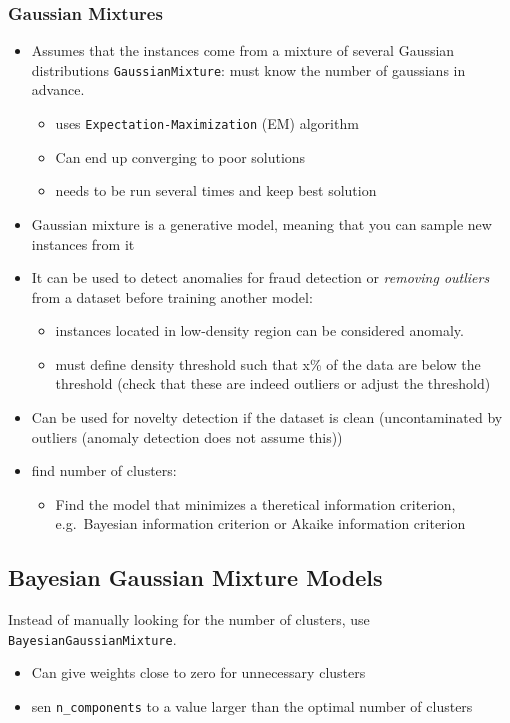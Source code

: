\subsubsection{Gaussian Mixtures}
\begin{itemize}
    \item Assumes that the instances come from a mixture of several Gaussian distributions
    \items \verb;GaussianMixture;: must know the number of gaussians in advance.
        \begin{itemize}
            \item uses \verb;Expectation-Maximization; (EM) algorithm
            \item Can end up converging to poor solutions
            \item[\arrow] needs to be run several times and keep best solution
        \end{itemize}
    \item Gaussian mixture is a generative model, meaning that you can sample new instances from it
    \item It can be used to detect anomalies for fraud detection or \textit{removing outliers} from a dataset before
        training another model:
        \begin{itemize}
            \item instances located in low-density region can be considered anomaly.
            \item[\arrow] must define density threshold such that x\% of the data are below the threshold (check that
                these are indeed outliers or adjust the threshold)
        \end{itemize}
    \item Can be used for novelty detection if the dataset is clean (uncontaminated by outliers (anomaly detection does
        not assume this))
    \item find number of clusters:
        \begin{itemize}
            \item Find the model that minimizes a theretical information criterion, e.g.\ Bayesian information criterion
                or Akaike information criterion
        \end{itemize}
\end{itemize}

\subsection{Bayesian Gaussian Mixture Models}
Instead of manually looking for the number of clusters, \arrow use \verb;BayesianGaussianMixture;.
\begin{itemize}
    \item Can give weights close to zero for unnecessary clusters
    \item sen \verb;n_components; to a value larger than the optimal number of clusters
\end{itemize}
